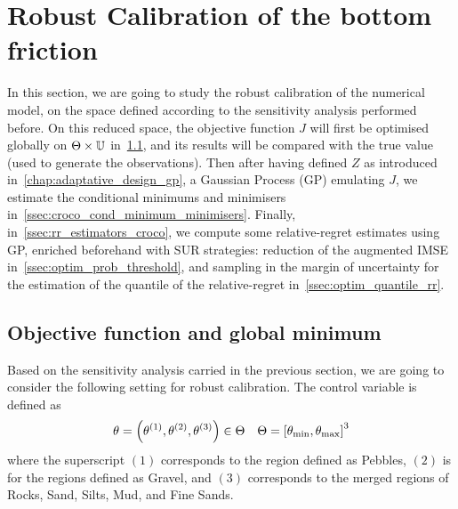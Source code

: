 \documentclass[../../Main_ManuscritThese.tex]{subfiles}
\newcommand{\zob}{z_b}
\begin{document}
\section{Robust Calibration of the bottom friction}
\label{sec:robust_calibration}
In this section, we are going to study the robust calibration of the
numerical model, on the space defined according to the sensitivity
analysis performed before. On this reduced space, the objective
function $J$ will first be optimised globally on
$\Theta \times \mathbb{U}$ in~\cref{ssec:glob_mini}, and its results
will be compared with the true value (used to generate the
observations). Then after having defined $Z$ as introduced
in~\cref{chap:adaptative_design_gp}, a Gaussian Process (GP) emulating
$J$, we estimate the conditional minimums and minimisers
in~\cref{ssec:croco_cond_minimum_minimisers}.  Finally,
in~\cref{ssec:rr_estimators_croco}, we compute some relative-regret
estimates using GP, enriched beforehand with SUR strategies: reduction of the
augmented IMSE in~\cref{ssec:optim_prob_threshold}, and sampling in
the margin of uncertainty for the estimation of the quantile of the
relative-regret in~\cref{ssec:optim_quantile_rr}.

\subsection{Objective function and global minimum}
\label{ssec:glob_mini}
Based on the sensitivity analysis carried in the previous section, we
are going to consider the following setting for robust calibration.
The control variable is defined as
\begin{equation}
  \kk=\left(\kk^{(1)},\kk^{(2)},\kk^{(3)}\right) \in \Kspace %
  \quad \Kspace = \interval{\kk_{\min}}{\kk_{\max}}^3
\end{equation}
 where the superscript $(1)$ corresponds to the region
defined as Pebbles, $(2)$ is for the regions defined as Gravel, and
$(3)$ corresponds to the merged regions of Rocks, Sand, Silts, Mud,
and Fine Sands.

\end{document}
